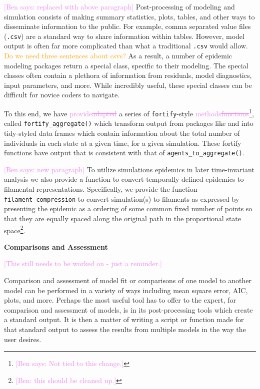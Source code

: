\documentclass[
  shortnames]{jss}
\begin{document}
\textcolor{violet}{[Ben says: replaced with above paragraph]}
Post-processing of modeling and simulation consists of making summary
statistics, plots, tables, and other ways to disseminate information to
the public. For example, comma separated value files (\texttt{.csv}) are
a standard way to share information within tables. However, model output
is often far more complicated than what a traditional \texttt{.csv}
would allow. \textcolor{orange}{Do we need three sentences about csvs?}
As a result, a number of epidemic modeling packages return a special
class, specific to their modeling. The special classes often contain a
plethora of information from residuals, model diagnostics, input
parameters, and more. While incredibly useful, these special classes can
be difficult for novice coders to navigate.

To this end, we have \textcolor{violet}{provide\sout{adapted}} a series
of \texttt{fortify}-style
\textcolor{violet}{methods\sout{functions}}\footnote{\textcolor{violet}{[Ben says: Not tied to this change.]}},
called \texttt{fortify\_aggregate()} which transform output from
packages like  and  into tidy-styled data frames
which contain information about the total number of individuals in each
state at a given time, for a given simulation. These fortify functions
have output that is consistent with that of
\texttt{agents\_to\_aggregate()}.

\textcolor{violet}{[Ben says: new paragraph]} To utilize simulations
epidemics in later time-invariant analysis we also provide a function to
convert temporally defined epidemics to filamental representations.
Specifically, we provide the function \texttt{filament\_compression} to
convert simulation(s) to filaments as expressed by presenting the
epidemic as a ordering of some common fixed number of points so that
they are equally spaced along the original path in the proportional
state
space\footnote{\textcolor{violet}{[Ben: this should be cleaned up.]}}.

\textbf{Comparisons and Assessment}

\textcolor{violet}{[This still needs to be worked on - just a reminder.]}

Comparison and assessment of model fit or comparisons of one model to
another model can be performed in a variety of ways including mean
square error, AIC, plots, and more. Perhaps the most useful tool
 has to offer to the expert, for comparison and
assessment of models, is in its post-processing tools which create a
standard output. It is then a matter of writing a script or function
made for that standard output to assess the results from multiple models
in the way the user desires.
\end{document}
